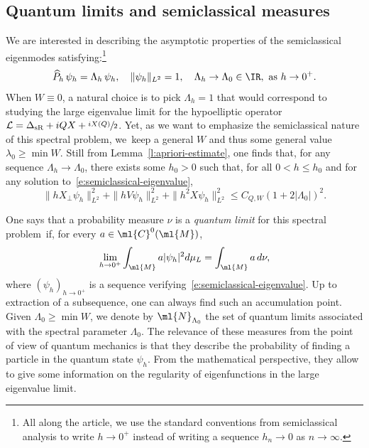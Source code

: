 \documentclass[10pt]{amsart}
\theoremstyle{plain}
\theoremstyle{definition}
\theoremstyle{remark}
\begin{document}
\subsection{Quantum limits and semiclassical measures}
We are interested in describing the asymptotic properties of the semiclassical eigenmodes satisfying:\footnote{All along the article, we use the standard conventions from semiclassical analysis to write $h\to 0^+$ instead of writing a sequence $h_n\to 0$ as $n\to\infty.$}
\begin{equation}\label{e:semiclassical-eigenvalue}
\widehat{P}_h \, \psi_h =\Lambda_h \, \psi_h,\quad\|\psi_h\|_{L^2}=1,\quad\Lambda_h\to\Lambda_0\in\IR,\ \text{as}\ h\to 0^+.
\end{equation}
When $W\equiv 0$, a natural choice is to pick $\Lambda_h=1$ that would correspond to studying the large eigenvalue limit for the hypoelliptic operator
$\mathcal{L}=\Delta_{\text{sR}}+iQX +\sfrac{iX(Q)}{2}$. Yet, as we want to emphasize the semiclassical nature of this spectral problem, we~keep a general $W$ and thus some general value $\lambda_0\geq\min W$. Still from Lemma~\ref{l:apriori-estimate}, one finds that, for any sequence $\Lambda_h\to \Lambda_0$, there exists some $h_0>0$ such that, for all $0<h\leq h_0$ and for any solution to~\eqref{e:semiclassical-eigenvalue},
\begin{equation}\label{e:apriori-semiclassical}
\|hX_\perp\psi_h\|_{L^2}^2+\|hV\psi_h\|_{L^2}^2+\|h^2X\psi_h\|_{L^2}^2\leq C_{Q,W}(1+2|\Lambda_0|)^2.
\end{equation}

One says that a probability measure $\nu$ is a \emph{quantum limit} for this spectral problem~if, for every $a\in\ml{C}^0(\ml{M})$,
\[
\lim_{h\to 0^+}\int_{\ml{M}}a|\psi_h|^2d\mu_L=\int_{\ml{M}}a \, d\nu,
\]
where $(\psi_h)_{h\to 0^+}$ is a sequence verifying~\eqref{e:semiclassical-eigenvalue}. Up to extraction of a subsequence, one can always find such an accumulation point. Given $\Lambda_0\geq\min W$, we denote by $\ml{N}_{\Lambda_0}$ the set of quantum limits associated with the spectral parameter $\Lambda_0$. The relevance of these measures from the point of view of quantum mechanics is that they describe the probability of finding a particle in the quantum state $\psi_h$. From the mathematical perspective, they allow to give some information on the regularity of eigenfunctions in the large eigenvalue limit.
\end{document}
